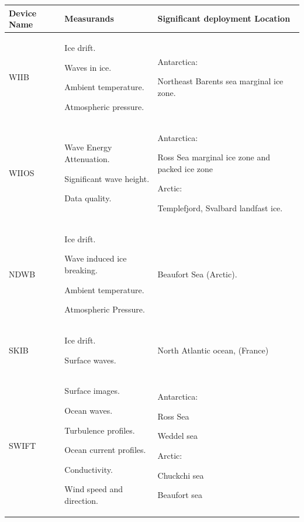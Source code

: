 \begin{center}
{\begin{longtable}[H]{|>{\RaggedRight}m{}|>{\RaggedRight}m{}|>{\RaggedRight}m{}|}
    \label{tab:device_deployment}\\
    \hline
    \textbf{Device Name} & \textbf{Measurands}& \textbf{Significant deployment Location}\\
    \hline
    WIIB    & Ice drift.\par Waves in ice. \par Ambient temperature. \par Atmospheric pressure. &Antarctica: \par  Northeast Barents sea marginal ice zone.\\
    \hline
    WIIOS   & Wave Energy Attenuation. \par Significant wave height. \par  Data quality. & Antarctica:  \par Ross Sea marginal ice zone and packed ice zone \cite{kohout_smith_roach_williams_montiel_williams_2020} \par \vspace{1.5mm} Arctic: \par Templefjord, Svalbard landfast ice. \\
    \hline
    NDWB    & Ice drift. \par Wave induced ice breaking. \par Ambient temperature. \par Atmospheric Pressure. & Beaufort Sea (Arctic). \\
    \hline
    SKIB    &Ice drift. \par Surface waves. & North Atlantic ocean,  (France) \cite{guimaraes2018surface}\\
    \hline
    SWIFT   &Surface images.\par Ocean waves. \par  Turbulence profiles. \par  Ocean current profiles.\par Conductivity. \par  Wind speed and direction. & Antarctica: \par Ross Sea \cite{ackley_2020_seaice} \par Weddel sea \cite{DeSanti2018OceanWave} \par 
    \vspace{1.5mm} Arctic: \par Chuckchi sea \cite{hosekova2020Attenuation} \par Beaufort sea \cite{lund2018Arctic}\\
    \hline

\end{longtable}}
\end{center}
